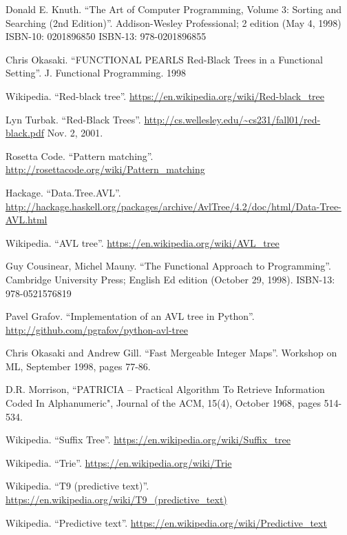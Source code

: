 \begin{thebibliography}{99}
Donald E. Knuth. ``The Art of Computer Programming, Volume 3: Sorting and Searching (2nd Edition)''. Addison-Wesley Professional; 2 edition (May 4, 1998) ISBN-10: 0201896850 ISBN-13: 978-0201896855

Chris Okasaki. ``FUNCTIONAL PEARLS Red-Black Trees in a Functional Setting''. J. Functional Programming. 1998

Wikipedia. ``Red-black tree''. \url{https://en.wikipedia.org/wiki/Red-black_tree}

Lyn Turbak. ``Red-Black Trees''. \url{http://cs.wellesley.edu/~cs231/fall01/red-black.pdf} Nov. 2, 2001.

Rosetta Code. ``Pattern matching''. \url{http://rosettacode.org/wiki/Pattern_matching}

Hackage. ``Data.Tree.AVL''. \url{http://hackage.haskell.org/packages/archive/AvlTree/4.2/doc/html/Data-Tree-AVL.html}

Wikipedia. ``AVL tree''. \url{https://en.wikipedia.org/wiki/AVL_tree}

Guy Cousinear, Michel Mauny. ``The Functional Approach to Programming''. Cambridge University Press; English Ed edition (October 29, 1998). ISBN-13: 978-0521576819

Pavel Grafov. ``Implementation of an AVL tree in Python''. \url{http://github.com/pgrafov/python-avl-tree}


Chris Okasaki and Andrew Gill. ``Fast Mergeable Integer Maps''. Workshop on ML, September 1998, pages 77-86.

D.R. Morrison, ``PATRICIA -- Practical Algorithm To Retrieve  Information Coded In Alphanumeric", Journal of the ACM, 15(4), October 1968, pages 514-534.

Wikipedia. ``Suffix Tree''. \url{https://en.wikipedia.org/wiki/Suffix_tree}

Wikipedia. ``Trie''. \url{https://en.wikipedia.org/wiki/Trie}

Wikipedia. ``T9 (predictive text)''. \url{https://en.wikipedia.org/wiki/T9_(predictive_text)}

Wikipedia. ``Predictive text''. \url{https://en.wikipedia.org/wiki/Predictive_text}


\end{thebibliography}
